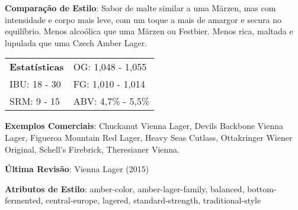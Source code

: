 \textbf{Comparação de Estilo}: Sabor de malte similar a uma Märzen, mas com intensidade e corpo mais leve, com um toque a mais de amargor e secura no equilíbrio. Menos alcoólica que uma Märzen ou Festbier. Menos rica, maltada e lupulada que uma Czech Amber Lager.

\begin{tabular}{@{}p{35mm}p{35mm}@{}}
  \textbf{Estatísticas} & OG: 1,048 - 1,055 \\
  IBU: 18 - 30 & FG: 1,010 - 1,014 \\
  SRM: 9 - 15 & ABV: 4,7\% - 5,5\%
\end{tabular}

\textbf{Exemplos Comerciais}: Chuckanut Vienna Lager, Devils Backbone Vienna Lager, Figueroa Mountain Red Lager, Heavy Seas Cutlass, Ottakringer Wiener Original, Schell’s Firebrick, Theresianer Vienna.

\textbf{Última Revisão}: Vienna Lager (2015)

\textbf{Atributos de Estilo}: amber-color, amber-lager-family, balanced, bottom-fermented, central-europe, lagered, standard-strength, traditional-style
